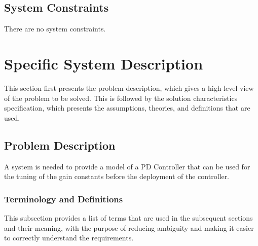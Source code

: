 \documentclass[12pt]{article}
\begin{document}
\subsection{System Constraints}
\label{Sec:SysConstraints}
There are no system constraints.

\section{Specific System Description}
\label{Sec:SpecSystDesc}
This section first presents the problem description, which gives a high-level view of the problem to be solved. This is followed by the solution characteristics specification, which presents the assumptions, theories, and definitions that are used.

\subsection{Problem Description}
\label{Sec:ProbDesc}
A system is needed to provide a model of a PD Controller that can be used for the tuning of the gain constants before the deployment of the controller.

\subsubsection{Terminology and Definitions}
\label{Sec:TermDefs}
This subsection provides a list of terms that are used in the subsequent sections and their meaning, with the purpose of reducing ambiguity and making it easier to correctly understand the requirements.
\end{document}
